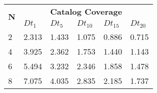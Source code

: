 \begin{table}[]
	\small
	\begin{tabular}{|l|l|l|l|l|l|}
		\hline
		\multicolumn{1}{|c|}{\multirow{2}{*}{\textbf{N}}}                 & \multicolumn{5}{c|}{\textbf{Catalog Coverage}}                                                                                                                                                                                                                                                                                                                                          \\ \cline{2-6}
		
 & \textbf{ $Dt_{1}$} & \textbf{$Dt_{5}$} & \textbf{ $Dt_{10}$} & \textbf{$Dt_{15}$} & \textbf{$Dt_{20}$} \\ \hline
		2                & 2.313                                                                    & 1.433                                                                    & 1.075                                                                     & 0.886                                                                     & 0.715                                                                     \\ \hline
		4                & 3.925                                                                    & 2.362                                                                    & 1.753                                                                     & 1.440                                                                     & 1.143                                                                     \\ \hline
		6                & 5.494                                                                    & 3.232                                                                    & 2.346                                                                     & 1.858                                                                     & 1.478                                                                     \\ \hline
		8                & 7.075                                                                    & 4.035                                                                    & 2.835                                                                     & 2.185                                                                     & 1.737                                                                     \\ \hline

\end{tabular}
\end{table}
